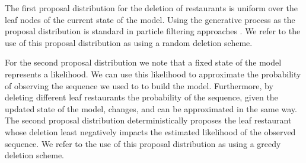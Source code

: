 The first proposal distribution for the deletion of restaurants is uniform over the leaf nodes of the current state of the model.  Using the generative process as the proposal distribution is standard in particle filtering approaches \cite{Doucet2001}.  We refer to the use of this proposal distribution as using a random deletion scheme.

For the second proposal distribution we note that a fixed state of the model represents a likelihood. We can use this likelihood to approximate the probability of observing the sequence we used to to build the model.  Furthermore, by deleting different leaf restaurants the probability of the sequence, given the updated state of the model, changes, and can be approximated in the same way.  The second proposal distribution deterministically proposes the leaf restaurant whose deletion least negatively impacts the estimated likelihood of the observed sequence.  We refer to the use of this proposal distribution as using a greedy deletion scheme. 





